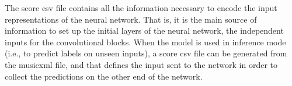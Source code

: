 
The score \gls{csv} file contains all the information
necessary to encode the input representations of the neural
network. That is, it is the main source of information to
set up the initial layers of the neural network, the
independent inputs for the convolutional blocks. When the
model is used in inference mode (i.e., to predict labels on
unseen inputs), a score \gls{csv} file can be generated
from the \gls{musicxml} file, and that defines the input
sent to the network in order to collect the predictions on
the other end of the network.
